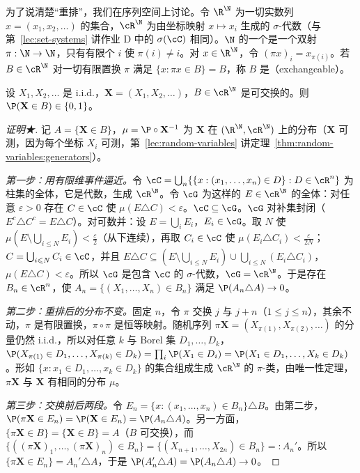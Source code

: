 为了说清楚“重排”，我们在序列空间上讨论。令 $\R^\N$ 为一切实数列 $x=(x_1,x_2,\dots)$ 的集合，$\cR^\N$ 为由坐标映射 $x\mapsto x_i$ 生成的 $\sigma$-代数（与第~\ref{lec:set-systems} 讲作业 D 中的 $\sigma(\cC)$ 相同）。$\N$ 的一个是一个双射 $\pi:\N\to\N$，只有有限个 $i$ 使 $\pi(i)\neq i$。对 $x\in\R^\N$，令 $(\pi x)_i=x_{\pi(i)}$。若 $B\in\cR^\N$ 对一切有限置换 $\pi$ 满足 $\{x:\pi x\in B\}=B$，称 $B$ 是（exchangeable）。

\begin{theorem}\label{thm:random-series:hewitt-savage}
设 $X_1,X_2,\dots$ 是 i.i.d.，$\mathbf X=(X_1,X_2,\dots)$，$B\in\cR^\N$ 是可交换的。则 $\P(\mathbf X\in B)\in\{0,1\}$。
\end{theorem}
\begin{proof}[证明★]
记 $A=\{\mathbf X\in B\}$，$\mu=\P\circ\mathbf X^{-1}$ 为 $\mathbf X$ 在 $(\R^\N,\cR^\N)$ 上的分布（$\mathbf X$ 可测，因为每个坐标 $X_i$ 可测，第~\ref{lec:random-variables} 讲定理~\ref{thm:random-variables:generators}）。

\emph{第一步：用有限维事件逼近。}令 $\cC=\bigcup_n\{\{x:(x_1,\dots,x_n)\in D\}:D\in\cR^n\}$ 为柱集的全体，它是代数，生成 $\cR^\N$。令 $\cG$ 为这样的 $E\in\cR^\N$ 的全体：对任意 $\varepsilon>0$ 存在 $C\in\cC$ 使 $\mu(E\triangle C)<\varepsilon$。$\cC\subseteq\cG$。$\cG$ 对补集封闭（$E^c\triangle C^c=E\triangle C$）。对可数并：设 $E=\bigcup_iE_i$，$E_i\in\cG$。取 $N$ 使 $\mu(E\setminus\bigcup_{i\leqslant N}E_i)<\frac\varepsilon2$（从下连续），再取 $C_i\in\cC$ 使 $\mu(E_i\triangle C_i)<\frac\varepsilon{2N}$；$C=\bigcup_{i\leqslant N}C_i\in\cC$，并且 $E\triangle C\subseteq(E\setminus\bigcup_{i\leqslant N}E_i)\cup\bigcup_{i\leqslant N}(E_i\triangle C_i)$，$\mu(E\triangle C)<\varepsilon$。所以 $\cG$ 是包含 $\cC$ 的 $\sigma$-代数，$\cG=\cR^\N$。于是存在 $B_n\in\cR^n$，使 $A_n=\{(X_1,\dots,X_n)\in B_n\}$ 满足 $\P(A_n\triangle A)\to0$。

\emph{第二步：重排后的分布不变。}固定 $n$，令 $\pi$ 交换 $j$ 与 $j+n$（$1\leqslant j\leqslant n$），其余不动，$\pi$ 是有限置换，$\pi\circ\pi$ 是恒等映射。随机序列 $\pi\mathbf X=(X_{\pi(1)},X_{\pi(2)},\dots)$ 的分量仍然 i.i.d.，所以对任意 $k$ 与 Borel 集 $D_1,\dots,D_k$，$\P(X_{\pi(1)}\in D_1,\dots,X_{\pi(k)}\in D_k)=\prod_i\P(X_1\in D_i)=\P(X_1\in D_1,\dots,X_k\in D_k)$。形如 $\{x:x_1\in D_1,\dots,x_k\in D_k\}$ 的集合组成生成 $\cR^\N$ 的 $\pi$-类，由唯一性定理，$\pi\mathbf X$ 与 $\mathbf X$ 有相同的分布 $\mu$。

\emph{第三步：交换前后两段。}令 $E_n=\{x:(x_1,\dots,x_n)\in B_n\}\triangle B$。由第二步，$\P(\pi\mathbf X\in E_n)=\P(\mathbf X\in E_n)=\P(A_n\triangle A)$。另一方面，$\{\pi\mathbf X\in B\}=\{\mathbf X\in B\}=A$（$B$ 可交换），而 $\{((\pi\mathbf X)_1,\dots,(\pi\mathbf X)_n)\in B_n\}=\{(X_{n+1},\dots,X_{2n})\in B_n\}=:A_n'$。所以 $\{\pi\mathbf X\in E_n\}=A_n'\triangle A$，于是 $\P(A_n'\triangle A)=\P(A_n\triangle A)\to0$。


\end{proof}
